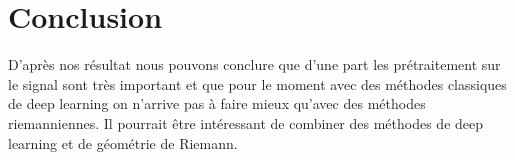 \documentclass{article}[12pt]
\begin{document}
\part{Conclusion}
D'après nos résultat nous pouvons conclure que d'une part les prétraitement sur le signal sont très important et que pour le moment avec des méthodes classiques de deep learning on n'arrive pas à faire mieux qu'avec des méthodes riemanniennes. Il pourrait être intéressant de combiner des méthodes de deep learning et de géométrie de Riemann.

 
\end{document}

